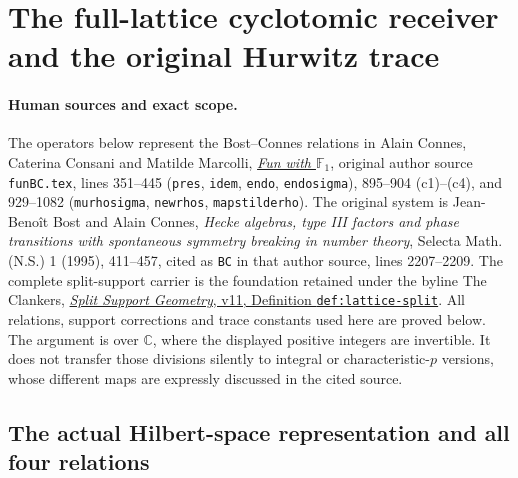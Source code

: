 \section{The full-lattice cyclotomic receiver and the original Hurwitz trace}
\label{sec:hurwitz-cyclotomic-receiver}

\paragraph{Human sources and exact scope.}
The operators below represent the Bost--Connes relations in Alain
Connes, Caterina Consani and Matilde Marcolli,
\href{https://arxiv.org/abs/0806.2401v1}{\emph{Fun with $\mathbb F_1$}},
original author source \nolinkurl{funBC.tex}, lines 351--445
(\texttt{pres}, \texttt{idem}, \texttt{endo}, \texttt{endosigma}),
895--904 (c1)--(c4), and 929--1082 (\texttt{murhosigma},
\texttt{newrhos}, \texttt{mapstilderho}). The original system is
Jean-Beno\^it Bost and Alain Connes, \emph{Hecke algebras, type III
factors and phase transitions with spontaneous symmetry breaking in
number theory}, Selecta Math. (N.S.) 1 (1995), 411--457, cited as
\texttt{BC} in that author source, lines 2207--2209.
The complete split-support carrier is the foundation retained under
the byline The Clankers,
\href{https://github.com/KokunoYumeto/zeta-function-research-reader/blob/a2851f9eb352e7e4376bc629de86fa4ed9c1c434/workbenches/splitzero-tandem/foundations/split-support-geometry-v11/split_support_geometry_arithmetic_curve_v11.tex}{\emph{Split Support Geometry}, v11, Definition \texttt{def:lattice-split}}.
All relations, support corrections and trace constants used here
are proved below. The argument is over $\mathbb C$, where the
displayed positive integers are invertible. It does not transfer
those divisions silently to integral or characteristic-$p$ versions,
whose different maps are expressly discussed in the cited source.

\subsection{The actual Hilbert-space representation and all four relations}

